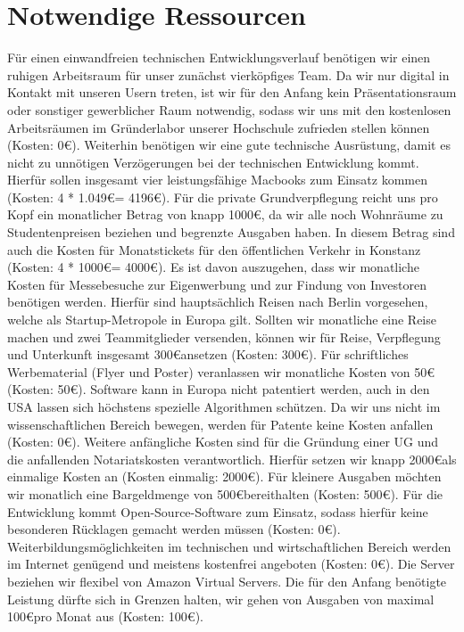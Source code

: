 \section{Notwendige Ressourcen}
Für einen einwandfreien technischen Entwicklungsverlauf benötigen wir einen ruhigen Arbeitsraum für unser zunächst vierköpfiges Team. Da wir nur digital in Kontakt mit unseren Usern treten, ist wir für den Anfang kein Präsentationsraum oder sonstiger gewerblicher Raum notwendig, sodass wir uns mit den kostenlosen Arbeitsräumen im Gründerlabor unserer Hochschule zufrieden stellen können (Kosten: 0\euro). 
Weiterhin benötigen wir eine gute technische Ausrüstung, damit es nicht zu unnötigen Verzögerungen bei der technischen Entwicklung kommt. Hierfür sollen insgesamt vier leistungsfähige Macbooks zum Einsatz kommen (Kosten: 4 * 1.049\euro = 4196\euro).
Für die private Grundverpflegung reicht uns pro Kopf ein monatlicher Betrag von knapp 1000\euro, da wir alle noch Wohnräume zu Studentenpreisen beziehen und begrenzte Ausgaben haben. In diesem Betrag sind auch die Kosten für Monatstickets für den öffentlichen Verkehr in Konstanz (Kosten: 4 * 1000\euro = 4000\euro).
Es ist davon auszugehen, dass wir monatliche Kosten für Messebesuche zur Eigenwerbung und zur Findung von Investoren benötigen werden. Hierfür sind hauptsächlich Reisen nach Berlin vorgesehen, welche als Startup-Metropole in Europa gilt. Sollten wir monatliche eine Reise machen und zwei Teammitglieder versenden, können wir für Reise, Verpflegung und Unterkunft insgesamt 300\euro ansetzen (Kosten: 300\euro).
Für schriftliches Werbematerial (Flyer und Poster) veranlassen wir monatliche Kosten von 50\euro (Kosten: 50\euro).
Software kann in Europa nicht patentiert werden, auch in den USA lassen sich höchstens spezielle Algorithmen schützen. Da wir uns nicht im wissenschaftlichen Bereich bewegen, werden für Patente keine Kosten anfallen (Kosten: 0\euro).
Weitere anfängliche Kosten sind für die Gründung einer UG und die anfallenden Notariatskosten verantwortlich. Hierfür setzen wir knapp 2000\euro als einmalige Kosten an (Kosten einmalig: 2000\euro).
Für kleinere Ausgaben möchten wir monatlich eine Bargeldmenge von 500\euro bereithalten (Kosten: 500\euro).
Für die Entwicklung kommt Open-Source-Software zum Einsatz, sodass hierfür keine besonderen Rücklagen gemacht werden müssen (Kosten: 0\euro).
Weiterbildungsmöglichkeiten im technischen und wirtschaftlichen Bereich werden im Internet genügend und meistens kostenfrei angeboten  (Kosten: 0\euro).
Die Server beziehen wir flexibel von Amazon Virtual Servers. Die für den Anfang benötigte Leistung dürfte sich in Grenzen halten, wir gehen von Ausgaben von maximal 100\euro pro Monat aus  (Kosten: 100\euro).
